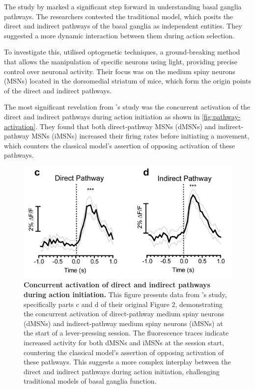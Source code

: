 \documentclass[10pt]{article}
\begin{document}
\begin{sloppypar}
  The study by \cite{cui_concurrent_2013} marked a significant step forward in understanding basal ganglia pathways. The researchers contested the traditional model, which posits the direct and indirect pathways of the basal ganglia as independent entities. They suggested a more dynamic interaction between them during action selection.

  To investigate this, \cite{cui_concurrent_2013} utilised optogenetic techniques, a ground-breaking method that allows the manipulation of specific neurons using light, providing precise control over neuronal activity. Their focus was on the medium spiny neurons (MSNs) located in the dorsomedial striatum of mice, which form the origin points of the direct and indirect pathways.

  The most significant revelation from \cite{cui_concurrent_2013}’s study was the concurrent activation of the direct and indirect pathways during action initiation as shown in \autoref{fig:pathway-activation}. They found that both direct-pathway MSNs (dMSNs) and indirect-pathway MSNs (iMSNs) increased their firing rates before initiating a movement, which counters the classical model’s assertion of opposing activation of these pathways.

  \begin{figure}[ht]
    \centering
    \includegraphics[width=\textwidth]{figures/direct-indirect-activation.png}
    \caption[Concurrent activation of direct and indirect pathways during action initiation]{\textbf{Concurrent activation of direct and indirect pathways during action initiation.} This figure presents data from \cite{cui_concurrent_2013}’s study, specifically parts c and d of their original Figure 2, demonstrating the concurrent activation of direct-pathway medium spiny neurons (dMSNs) and indirect-pathway medium spiny neurons (iMSNs) at the start of a lever-pressing session. The fluorescence traces indicate increased activity for both dMSNs and iMSNs at the session start, countering the classical model’s assertion of opposing activation of these pathways. This suggests a more complex interplay between the direct and indirect pathways during action initiation, challenging traditional models of basal ganglia function.}
    \label{fig:pathway-activation}
  \end{figure}


\end{sloppypar}
\end{document}
